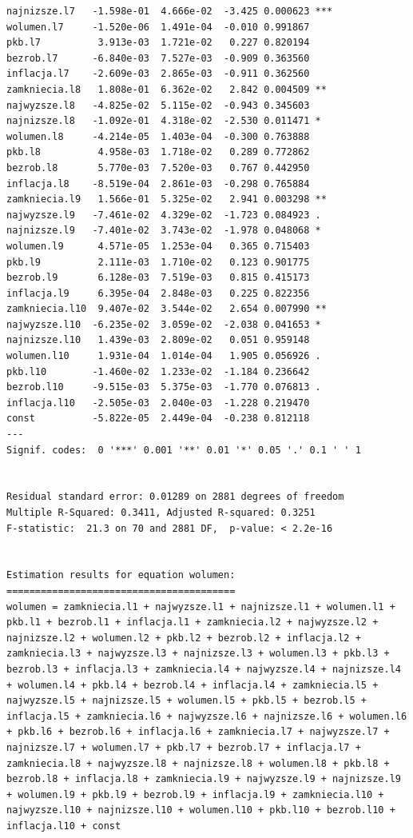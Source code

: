 \documentclass[
  polish,
  letterpaper,
  DIV=11,
  numbers=noendperiod]{scrartcl}
\begin{document}
\begin{verbatim}
najnizsze.l7   -1.598e-01  4.666e-02  -3.425 0.000623 ***
wolumen.l7     -1.520e-06  1.491e-04  -0.010 0.991867    
pkb.l7          3.913e-03  1.721e-02   0.227 0.820194    
bezrob.l7      -6.840e-03  7.527e-03  -0.909 0.363560    
inflacja.l7    -2.609e-03  2.865e-03  -0.911 0.362560    
zamkniecia.l8   1.808e-01  6.362e-02   2.842 0.004509 ** 
najwyzsze.l8   -4.825e-02  5.115e-02  -0.943 0.345603    
najnizsze.l8   -1.092e-01  4.318e-02  -2.530 0.011471 *  
wolumen.l8     -4.214e-05  1.403e-04  -0.300 0.763888    
pkb.l8          4.958e-03  1.718e-02   0.289 0.772862    
bezrob.l8       5.770e-03  7.520e-03   0.767 0.442950    
inflacja.l8    -8.519e-04  2.861e-03  -0.298 0.765884    
zamkniecia.l9   1.566e-01  5.325e-02   2.941 0.003298 ** 
najwyzsze.l9   -7.461e-02  4.329e-02  -1.723 0.084923 .  
najnizsze.l9   -7.401e-02  3.743e-02  -1.978 0.048068 *  
wolumen.l9      4.571e-05  1.253e-04   0.365 0.715403    
pkb.l9          2.111e-03  1.710e-02   0.123 0.901775    
bezrob.l9       6.128e-03  7.519e-03   0.815 0.415173    
inflacja.l9     6.395e-04  2.848e-03   0.225 0.822356    
zamkniecia.l10  9.407e-02  3.544e-02   2.654 0.007990 ** 
najwyzsze.l10  -6.235e-02  3.059e-02  -2.038 0.041653 *  
najnizsze.l10   1.439e-03  2.809e-02   0.051 0.959148    
wolumen.l10     1.931e-04  1.014e-04   1.905 0.056926 .  
pkb.l10        -1.460e-02  1.233e-02  -1.184 0.236642    
bezrob.l10     -9.515e-03  5.375e-03  -1.770 0.076813 .  
inflacja.l10   -2.505e-03  2.040e-03  -1.228 0.219470    
const          -5.822e-05  2.449e-04  -0.238 0.812118    
---
Signif. codes:  0 '***' 0.001 '**' 0.01 '*' 0.05 '.' 0.1 ' ' 1


Residual standard error: 0.01289 on 2881 degrees of freedom
Multiple R-Squared: 0.3411, Adjusted R-squared: 0.3251 
F-statistic:  21.3 on 70 and 2881 DF,  p-value: < 2.2e-16 


Estimation results for equation wolumen: 
======================================== 
wolumen = zamkniecia.l1 + najwyzsze.l1 + najnizsze.l1 + wolumen.l1 + pkb.l1 + bezrob.l1 + inflacja.l1 + zamkniecia.l2 + najwyzsze.l2 + najnizsze.l2 + wolumen.l2 + pkb.l2 + bezrob.l2 + inflacja.l2 + zamkniecia.l3 + najwyzsze.l3 + najnizsze.l3 + wolumen.l3 + pkb.l3 + bezrob.l3 + inflacja.l3 + zamkniecia.l4 + najwyzsze.l4 + najnizsze.l4 + wolumen.l4 + pkb.l4 + bezrob.l4 + inflacja.l4 + zamkniecia.l5 + najwyzsze.l5 + najnizsze.l5 + wolumen.l5 + pkb.l5 + bezrob.l5 + inflacja.l5 + zamkniecia.l6 + najwyzsze.l6 + najnizsze.l6 + wolumen.l6 + pkb.l6 + bezrob.l6 + inflacja.l6 + zamkniecia.l7 + najwyzsze.l7 + najnizsze.l7 + wolumen.l7 + pkb.l7 + bezrob.l7 + inflacja.l7 + zamkniecia.l8 + najwyzsze.l8 + najnizsze.l8 + wolumen.l8 + pkb.l8 + bezrob.l8 + inflacja.l8 + zamkniecia.l9 + najwyzsze.l9 + najnizsze.l9 + wolumen.l9 + pkb.l9 + bezrob.l9 + inflacja.l9 + zamkniecia.l10 + najwyzsze.l10 + najnizsze.l10 + wolumen.l10 + pkb.l10 + bezrob.l10 + inflacja.l10 + const 


\end{verbatim}
\end{document}

